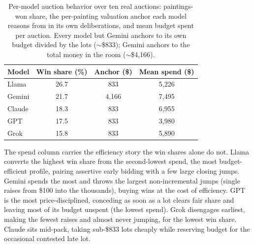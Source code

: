 \begin{table}[htbp]
\caption{Per-model auction behavior over ten real auctions: paintings-won share, the per-painting valuation anchor each model reasons from in its own deliberations, and mean budget spent per auction. Every model but Gemini anchors to its own budget divided by the lots ($\sim$\$833); Gemini anchors to the total money in the room ($\sim$\$4{,}166).}
\label{tab:auction_behavior}
\centering
\begin{tabular}{lccc}
\hline
Model & Win share (\%) & Anchor (\$) & Mean spend (\$) \\
\hline
Llama & 26.7 & 833   & 5{,}226 \\
Gemini & 21.7 & 4{,}166 & 7{,}495 \\
Claude & 18.3 & 833   & 6{,}955 \\
GPT   & 17.5 & 833   & 3{,}980 \\
Grok  & 15.8 & 833   & 5{,}890 \\
\hline
\end{tabular}
\end{table}

The spend column carries the efficiency story the win shares alone do not. Llama converts the highest win share from the second-lowest spend, the most budget-efficient profile, pairing assertive early bidding with a few large closing jumps. Gemini spends the most and throws the largest non-incremental jumps (single raises from \$100 into the thousands), buying wins at the cost of efficiency. GPT is the most price-disciplined, conceding as soon as a lot clears fair share and leaving most of its budget unspent (the lowest spend). Grok disengages earliest, making the fewest raises and almost never jumping, for the lowest win share. Claude sits mid-pack, taking sub-\$833 lots cheaply while reserving budget for the occasional contested late lot.

